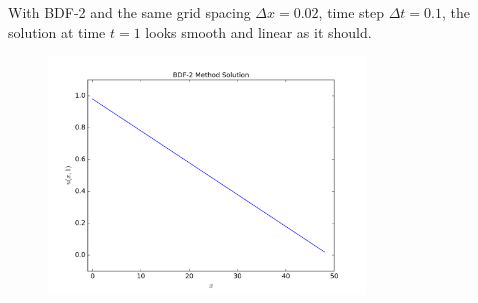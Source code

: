 \documentclass[12pt]{article}
\begin{document}
With BDF-2 and the same grid spacing $\Delta x = 0.02$, time step $\Delta t = 0.1$, the solution at time $t=1$ looks smooth and linear as it should.

\begin{figure}[H]
\centering\includegraphics[width=0.75\textwidth]{problem3_bdf2_fixedissue.png}
\end{figure}
\end{document}
